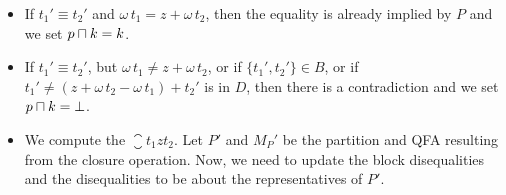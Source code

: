\begin{itemize}
\begin{itemize}
        \item If $t_1' \equiv t_2'$ and $\omega\,t_1 = z + \omega\,t_2$,
        then the equality is already implied by $P$ and we set $p \sqcap k = k$.
        \item If $t_1' \equiv t_2'$, but $\omega\,t_1 \neq z + \omega\,t_2$,
        or if $\{t_1',t_2'\}\in B$, or if $t_1' \neq (z + \omega\,t_2 - \omega\,t_1) + t_2'$ is in $D$,
        then there is a contradiction and we set $p \sqcap k = \bot$.
        \item We compute the $\closure{t_1}{z}{t_2}$.
        Let $P'$ and $M_P'$ be the partition and QFA resulting from the closure operation.
        Now, we need to update the block disequalities and the disequalities to be about the representatives of $P'$.
    \end{itemize}
\end{itemize}
